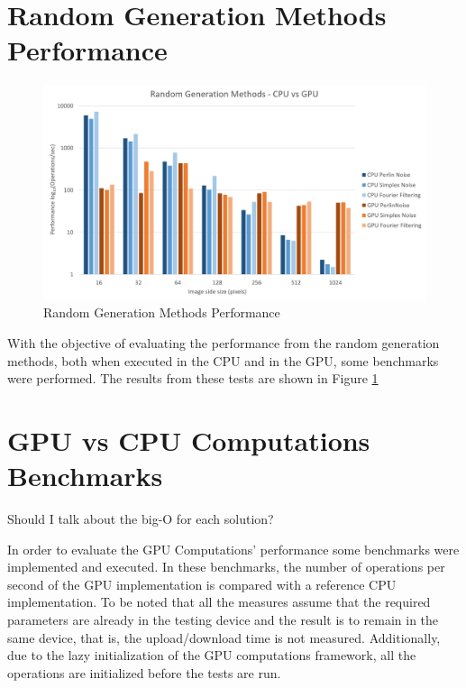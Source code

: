     
  
  \section{Random Generation Methods Performance}

    \begin{figure}[H]
    	\centering
    	\includegraphics[width=\plotwidth]{images/results/benchmarks/plot-rgm}
    	\caption{Random Generation Methods Performance}
    	\label{fig:plot-rgm}
    \end{figure}
    
    With the objective of evaluating the performance from the random generation methods, both when executed in the CPU and in the GPU, some benchmarks were performed. The results from these tests are shown in Figure \ref{fig:plot-rgm} 
  
  \section {GPU vs CPU Computations Benchmarks}
    
    \begin{notes}
      \item Should I talk about the big-O for each solution?
    \end{notes}
    
    In order to evaluate the GPU Computations' performance some benchmarks were implemented and executed. In these benchmarks, the number of operations per second of the GPU implementation is compared with a reference CPU implementation. To be noted that all the measures assume that the required parameters are already in the testing device and the result is to remain in the same device, that is, the upload/download time is not measured. Additionally, due to the lazy initialization of the GPU computations framework, all the operations are initialized before the tests are run. 
    
